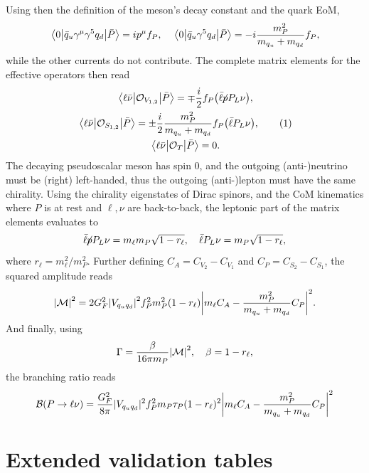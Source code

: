 \documentclass[preprint,11pt]{elsarticle}
\newcommand{\fsl}[1]{{\centernot{#1}}}
\newcommand\numberthis{\addtocounter{equation}{1}\tag{\theequation}}
\begin{document}
Using then the definition of the meson's decay constant and the quark EoM,
\begin{equation}
    \mel{0}{\bar q_u\gamma^\mu\gamma^5 q_d}{\bar P}=ip^\mu f_P\qc \mel{0}{\bar q_u\gamma^5 q_d}{\bar P}=-i\frac{m_P^2}{m_{q_u}+m_{q_d}}f_P,
\end{equation}
while the other currents do not contribute. The complete matrix elements for the effective operators then read
\begin{gather*}
    \mel{\ell\bar\nu}{\mathcal{O}_{V_{1,2}}}{\bar P}=\mp\frac{i}{2}f_P\qty(\bar\ell\fsl{p}P_L\nu),\\
    \mel{\ell\bar\nu}{\mathcal{O}_{S_{1,2}}}{\bar P}=\pm\frac{i}{2}\frac{m_P^2}{m_{q_u}+m_{q_d}}f_P\qty(\bar\ell P_L\nu),\numberthis{}\\
    \mel{\ell\bar\nu}{\mathcal{O}_{T}}{\bar P}=0.
\end{gather*}
The decaying pseudoscalar meson has spin 0, and the outgoing (anti-)neutrino must be (right) left-handed, thus the outgoing (anti-)lepton must have the same chirality. Using the chirality eigenstates of Dirac spinors, and the CoM kinematics where $P$ is at rest and $\ell,\nu$ are back-to-back, the leptonic part of the matrix elements evaluates to
\begin{equation}
    \bar\ell\fsl{p}P_L\nu=m_\ell m_P\sqrt{1-r_\ell}\qc \bar\ell P_L\nu=m_P\sqrt{1-r_\ell},
\end{equation}
where $r_\ell=m_\ell^2/m_P^2$. Further defining $C_A=C_{V_2}-C_{V_1}$ and $C_P=C_{S_2}-C_{S_1}$, the squared amplitude reads
\begin{equation}
    \qty|\mathcal{M}|^2=2G_F^2\qty|V_{q_uq_d}|^2f_P^2m_P^2(1-r_\ell)\qty|m_\ell C_A-\frac{m_P^2}{m_{q_u}+m_{q_d}}C_P|^2.
\end{equation}
And finally, using
\begin{equation}
    \Gamma=\frac{\beta}{16\pi m_P}\qty|\mathcal{M}|^2\qc\beta=1-r_\ell,
\end{equation}
the branching ratio reads
\begin{equation}
    \mathcal{B}(P\to\ell\nu)=\frac{G_F^2}{8\pi}|V_{q_uq_d}|^2f_P^2m_P\tau_P(1-r_\ell)^2\qty|m_\ell C_A-\frac{m_P^2}{m_{q_u}+m_{q_d}}C_P|^2
\end{equation}

\section{Extended validation tables}\label{app:extended_validation_tables}
\end{document}

